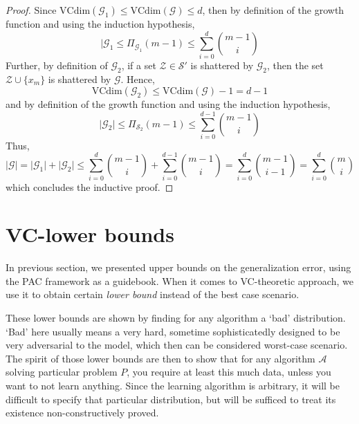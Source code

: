 \begin{proof}
    Since $\mathrm{VCdim}(\mathcal{G}_{1})\leq \mathrm{VCdim}(\mathcal{G})\leq d$, then by definition of the growth function and using the induction hypothesis, 
    \begin{equation}
        \lvert \mathcal{G}_{1} \leq \Pi_{\mathcal{G}_{1}}(m-1) \leq \sum^{d}_{i=0} {m-1 \choose i}
    \end{equation}
    Further, by definition of $\mathcal{G}_{2}$, if a set $\mathcal{Z}\in \mathcal{S}'$ is shattered by $\mathcal{G}_{2}$, then the set $\mathcal{Z}\cup\{x_m\}$ is shattered by $\mathcal{G}$. Hence, 
    \begin{equation}
        \mathrm{VCdim}(\mathcal{G}_{2}) \leq \mathrm{VCdim}(\mathcal{G}) -1 = d-1
    \end{equation}
    and by definition of the growth function and using the induction hypothesis, 
    \begin{equation}
        \lvert \mathcal{G}_{2} \rvert \leq \Pi_{\mathcal{S}_{2}} (m-1) \leq \sum^{d-1}_{i=0} {m-1 \choose i}
    \end{equation}
    Thus, 
    \begin{equation}
        \lvert\mathcal{G}\rvert = \lvert\mathcal{G}_{1}\rvert + \lvert\mathcal{G}_{2}\rvert \leq \sum^{d}_{i=0} {m-1\choose i} + \sum^{d-1}_{i=0} {m-1\choose i} = \sum^{d}_{i=0} {m-1\choose i-1} = \sum^{d}_{i=0} {m\choose i}
    \end{equation}
    which concludes the inductive proof. 
\end{proof}

\section{VC-lower bounds}
In previous section, we presented upper bounds on the generalization error, using the PAC framework as a guidebook. When it comes to VC-theoretic approach, we use it to obtain certain \textit{lower bound} instead of the best case scenario. 

These lower bounds are shown by finding for any algorithm a `bad' distribution. `Bad' here usually means a very hard, sometime sophisticatedly designed to be very adversarial to the model, which then can be considered worst-case scenario. The spirit of those lower bounds are then to show that for any algorithm $\mathcal{A}$ solving particular problem $P$, you require at least this much data, unless you want to not learn anything. Since the learning algorithm is arbitrary, it will be difficult to specify that particular distribution, but will be sufficed to treat its existence non-constructively proved. 

